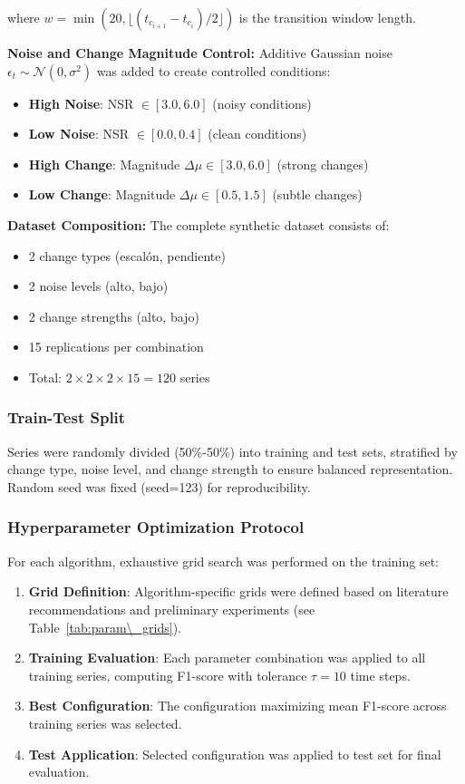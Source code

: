 \documentclass[journal,article,submit,pdftex,moreauthors]{Definitions/mdpi}
\begin{document}
where $w = \min(20, \lfloor (t_{c_{i+1}} - t_{c_i})/2 \rfloor)$ is the transition window length.

\textbf{Noise and Change Magnitude Control:} Additive Gaussian noise $\epsilon_t \sim \mathcal{N}(0, \sigma^2)$ was added to create controlled conditions:
\begin{itemize}
    \item \textbf{High Noise}: NSR $\in [3.0, 6.0]$ (noisy conditions)
    \item \textbf{Low Noise}: NSR $\in [0.0, 0.4]$ (clean conditions)
    \item \textbf{High Change}: Magnitude $\Delta \mu \in [3.0, 6.0]$ (strong changes)
    \item \textbf{Low Change}: Magnitude $\Delta \mu \in [0.5, 1.5]$ (subtle changes)
\end{itemize}

\textbf{Dataset Composition:} The complete synthetic dataset consists of:
\begin{itemize}
    \item 2 change types (escalón, pendiente)
    \item 2 noise levels (alto, bajo)
    \item 2 change strengths (alto, bajo)
    \item 15 replications per combination
    \item Total: $2 \times 2 \times 2 \times 15 = 120$ series
\end{itemize}

\subsubsection{Train-Test Split}

Series were randomly divided (50\%-50\%) into training and test sets, stratified by change type, noise level, and change strength to ensure balanced representation. Random seed was fixed (seed=123) for reproducibility.

\subsubsection{Hyperparameter Optimization Protocol}

For each algorithm, exhaustive grid search was performed on the training set:
\begin{enumerate}
    \item \textbf{Grid Definition}: Algorithm-specific grids were defined based on literature recommendations and preliminary experiments (see Table~\ref{tab:param\_grids}).
    \item \textbf{Training Evaluation}: Each parameter combination was applied to all training series, computing F1-score with tolerance $\tau = 10$ time steps.
    \item \textbf{Best Configuration}: The configuration maximizing mean F1-score across training series was selected.
    \item \textbf{Test Application}: Selected configuration was applied to test set for final evaluation.
\end{enumerate}
\end{document}
